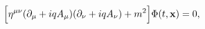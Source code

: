 \begin{equation}
\Bigl[ \eta^{\mu \nu} (\partial_{\mu} + i
q A_{\mu}) (\partial_{\nu} + i q
A_{\nu})  + m^2 \Bigr] \Phi (t, {\bf x}) = 0, \label{kg
eq}
\end{equation}

